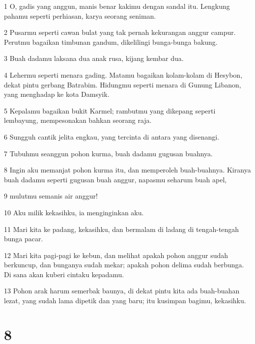 \par 1 O, gadis yang anggun, manis benar kakimu dengan sandal itu. Lengkung pahamu seperti perhiasan, karya seorang seniman.
\par 2 Pusarmu seperti cawan bulat yang tak pernah kekurangan anggur campur. Perutmu bagaikan timbunan gandum, dikelilingi bunga-bunga bakung.
\par 3 Buah dadamu laksana dua anak rusa, kijang kembar dua.
\par 4 Lehermu seperti menara gading. Matamu bagaikan kolam-kolam di Hesybon, dekat pintu gerbang Batrabim. Hidungmu seperti menara di Gunung Libanon, yang menghadap ke kota Damsyik.
\par 5 Kepalamu bagaikan bukit Karmel; rambutmu yang dikepang seperti lembayung, mempesonakan bahkan seorang raja.
\par 6 Sungguh cantik jelita engkau, yang tercinta di antara yang disenangi.
\par 7 Tubuhmu seanggun pohon kurma, buah dadamu gugusan buahnya.
\par 8 Ingin aku memanjat pohon kurma itu, dan memperoleh buah-buahnya. Kiranya buah dadamu seperti gugusan buah anggur, napasmu seharum buah apel,
\par 9 mulutmu semanis air anggur!
\par 10 Aku milik kekasihku, ia menginginkan aku.
\par 11 Mari kita ke padang, kekasihku, dan bermalam di ladang di tengah-tengah bunga pacar.
\par 12 Mari kita pagi-pagi ke kebun, dan melihat apakah pohon anggur sudah berkuncup, dan bunganya sudah mekar; apakah pohon delima sudah berbunga. Di sana akan kuberi cintaku kepadamu.
\par 13 Pohon arak harum semerbak baunya, di dekat pintu kita ada buah-buahan lezat, yang sudah lama dipetik dan yang baru; itu kusimpan bagimu, kekasihku.

\chapter{8}

